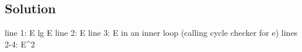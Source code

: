 \subsection*{Solution}

line 1: E lg E
line 2: E
line 3: E in an inner loop (calling cycle checker for e)
lines 2-4: E^2
